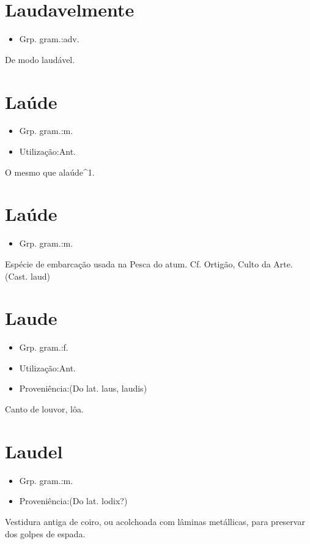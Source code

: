 \section{Laudavelmente}
\begin{itemize}
\item {Grp. gram.:adv.}
\end{itemize}
De modo laudável.
\section{Laúde}
\begin{itemize}
\item {Grp. gram.:m.}
\end{itemize}
\begin{itemize}
\item {Utilização:Ant.}
\end{itemize}
O mesmo que \textunderscore alaúde\textunderscore ^1.
\section{Laúde}
\begin{itemize}
\item {Grp. gram.:m.}
\end{itemize}
Espécie de embarcação usada na Pesca do atum. Cf. Ortigão, \textunderscore Culto da Arte\textunderscore .
(Cast. \textunderscore laud\textunderscore )
\section{Laude}
\begin{itemize}
\item {Grp. gram.:f.}
\end{itemize}
\begin{itemize}
\item {Utilização:Ant.}
\end{itemize}
\begin{itemize}
\item {Proveniência:(Do lat. \textunderscore laus\textunderscore , \textunderscore laudis\textunderscore )}
\end{itemize}
Canto de louvor, lôa.
\section{Laudel}
\begin{itemize}
\item {Grp. gram.:m.}
\end{itemize}
\begin{itemize}
\item {Proveniência:(Do lat. \textunderscore lodix\textunderscore ?)}
\end{itemize}
Vestidura antiga de coiro, ou acolchoada com lâminas metállicas, para preservar dos golpes de espada.
